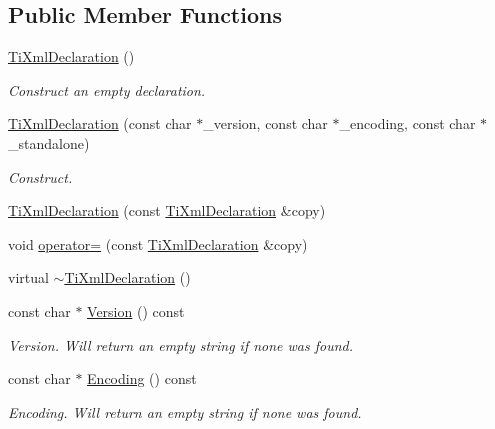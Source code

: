 \subsection*{Public Member Functions}
\begin{DoxyCompactItemize}
\item 
\hyperlink{class_ti_xml_declaration_aa0484d059bea0ea1acb47c9094382d79}{TiXmlDeclaration} ()
\begin{DoxyCompactList}\small\item\em Construct an empty declaration. \item\end{DoxyCompactList}\item 
\hyperlink{class_ti_xml_declaration_a3b618d1c30c25e4b7a71f31a595ee298}{TiXmlDeclaration} (const char $\ast$\_\-version, const char $\ast$\_\-encoding, const char $\ast$\_\-standalone)
\begin{DoxyCompactList}\small\item\em Construct. \item\end{DoxyCompactList}\item 
\hyperlink{class_ti_xml_declaration_a58ac9042c342f7845c8491da0bb091e8}{TiXmlDeclaration} (const \hyperlink{class_ti_xml_declaration}{TiXmlDeclaration} \&copy)
\item 
void \hyperlink{class_ti_xml_declaration_a0fedc57539af9049be8db2d7d9d9ba33}{operator=} (const \hyperlink{class_ti_xml_declaration}{TiXmlDeclaration} \&copy)
\item 
virtual \hyperlink{class_ti_xml_declaration_ad5f37a673f4c507fd7e550470f9cec25}{$\sim$TiXmlDeclaration} ()
\item 
const char $\ast$ \hyperlink{class_ti_xml_declaration_a02ee557b1a4545c3219ed377c103ec76}{Version} () const 
\begin{DoxyCompactList}\small\item\em Version. Will return an empty string if none was found. \item\end{DoxyCompactList}\item 
const char $\ast$ \hyperlink{class_ti_xml_declaration_a5d974231f9e9a2f0542f15f3a46cdb76}{Encoding} () const 
\begin{DoxyCompactList}\small\item\em Encoding. Will return an empty string if none was found. \item\end{DoxyCompactList}\item 

\end{DoxyCompactItemize}
